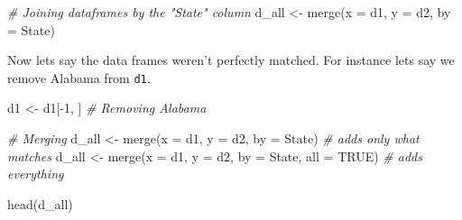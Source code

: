 \documentclass[
]{book}
\newenvironment{Shaded}{\begin{snugshade}}{\end{snugshade}}
\newcommand{\AttributeTok}[1]{\textcolor[rgb]{0.77,0.63,0.00}{#1}}
\newcommand{\CommentTok}[1]{\textcolor[rgb]{0.56,0.35,0.01}{\textit{#1}}}
\newcommand{\ConstantTok}[1]{\textcolor[rgb]{0.00,0.00,0.00}{#1}}
\newcommand{\DecValTok}[1]{\textcolor[rgb]{0.00,0.00,0.81}{#1}}
\newcommand{\FunctionTok}[1]{\textcolor[rgb]{0.00,0.00,0.00}{#1}}
\newcommand{\NormalTok}[1]{#1}
\newcommand{\OtherTok}[1]{\textcolor[rgb]{0.56,0.35,0.01}{#1}}
\newcommand{\SpecialCharTok}[1]{\textcolor[rgb]{0.00,0.00,0.00}{#1}}
\newcommand{\StringTok}[1]{\textcolor[rgb]{0.31,0.60,0.02}{#1}}
\begin{document}
\begin{Shaded}
\end{Shaded}

\begin{Shaded}
\begin{Highlighting}[]
\CommentTok{\# Joining dataframes by the "State" column}
\NormalTok{d\_all }\OtherTok{\textless{}{-}} \FunctionTok{merge}\NormalTok{(}\AttributeTok{x =}\NormalTok{ d1, }\AttributeTok{y =}\NormalTok{ d2, }\AttributeTok{by =} \StringTok{\textquotesingle{}State\textquotesingle{}}\NormalTok{)}
\end{Highlighting}
\end{Shaded}

Now lets say the data frames weren't perfectly matched.
For instance lets say we remove Alabama from \texttt{d1}.

\begin{Shaded}
\begin{Highlighting}[]
\NormalTok{d1 }\OtherTok{\textless{}{-}}\NormalTok{ d1[}\SpecialCharTok{{-}}\DecValTok{1}\NormalTok{, ]  }\CommentTok{\# Removing Alabama}

\CommentTok{\# Merging}
\NormalTok{d\_all }\OtherTok{\textless{}{-}} \FunctionTok{merge}\NormalTok{(}\AttributeTok{x =}\NormalTok{ d1, }\AttributeTok{y =}\NormalTok{ d2, }\AttributeTok{by =} \StringTok{\textquotesingle{}State\textquotesingle{}}\NormalTok{)  }\CommentTok{\# adds only what matches}
\NormalTok{d\_all }\OtherTok{\textless{}{-}} \FunctionTok{merge}\NormalTok{(}\AttributeTok{x =}\NormalTok{ d1, }\AttributeTok{y =}\NormalTok{ d2, }\AttributeTok{by =} \StringTok{\textquotesingle{}State\textquotesingle{}}\NormalTok{, }\AttributeTok{all =} \ConstantTok{TRUE}\NormalTok{)  }\CommentTok{\# adds everything}

\FunctionTok{head}\NormalTok{(d\_all)}
\end{Highlighting}
\end{Shaded}
\end{document}

